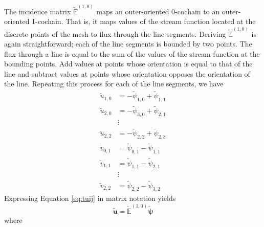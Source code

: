 The incidence matrix $\tilde{\mathbb{E}}^{(1,0)}$ maps an outer-oriented 0-cochain to an outer-oriented 1-cochain. That is, it maps values of the stream function located at the discrete points of the mesh to flux through the line segments. Deriving $\tilde{\mathbb{E}}^{(1,0)}$ is again straightforward; each of the line segments is bounded by two points. The flux through a line is equal to the sum of the values of the stream function at the bounding points. Add values at points whose orientation is equal to that of the line and subtract values at points whose orientation opposes the orientation of the line. Repeating this process for each of the line segments, we have
\begin{equation}
    \begin{split}
        \tilde{u}_{1,0} &= -\tilde{\psi}_{1,0} + \tilde{\psi}_{1,1} \\
        \tilde{u}_{2,0} &= -\tilde{\psi}_{3,0} + \tilde{\psi}_{2,1} \\
        &\vdots \\
        \tilde{u}_{2,2} &= -\tilde{\psi}_{2,2} + \tilde{\psi}_{2,3} \\
        \tilde{v}_{0,1} &= \tilde{\psi}_{0,1} - \tilde{\psi}_{1,1} \\
        \tilde{v}_{1,1} &= \tilde{\psi}_{1,1} - \tilde{\psi}_{2,1} \\
        &\vdots \\
        \tilde{v}_{2,2} &= \tilde{\psi}_{2,2} - \tilde{\psi}_{3,2}
    \end{split}
    \label{eq:tuij}
\end{equation}
Expressing Equation \eqref{eq:tuij} in matrix notation yields
\begin{equation}
    \mathbf{\tilde{u}} = \mathbb{\tilde{E}}^{(1,0)} \mathbf{\tilde{\psi}}
\end{equation}
where
